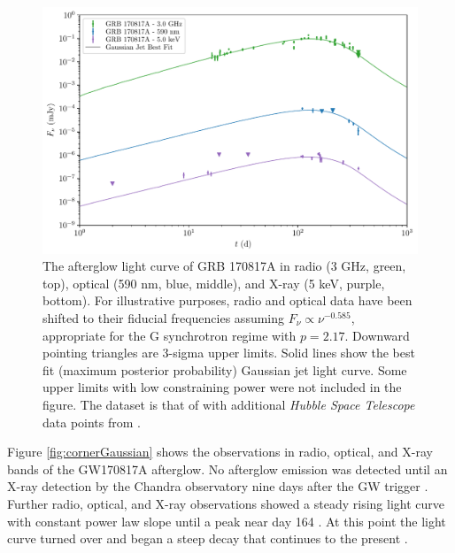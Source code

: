 \documentclass[twocolumn]{aastex62}
\newcommand{\gwbns}{GW170817A}
\newcommand{\grbbns}{GRB 170817A}
\newcommand{\hubble}{{\em Hubble Space Telescope}}
\begin{document}
\begin{figure}
	\includegraphics[width=\textwidth]{figs/lc_170817A_Gaussian_map.pdf}
	\caption{The afterglow light curve of \grbbns{} in radio (3 GHz, green, top), optical (590 nm, blue, middle), and X-ray (5 keV, purple, bottom).  For illustrative purposes, radio and optical data have been shifted to their fiducial frequencies assuming $F_\nu \propto \nu^{-0.585}$, appropriate for the G synchrotron regime with $p=2.17$. Downward pointing triangles are 3-sigma upper limits.  Solid lines show the best fit (maximum posterior probability) Gaussian jet light curve.  Some upper limits with low constraining power were not included in the figure.  The dataset is that of \citet{Troja:2019ab} with additional \hubble{} data points from \citet{Lamb:2019aa}.  \label{fig:lc170817A}}
\end{figure}

Figure \ref{fig:cornerGaussian} shows the observations in radio, optical, and X-ray bands of the \gwbns{} afterglow.  No afterglow emission was detected until an X-ray detection by the Chandra observatory nine days after the GW trigger \cite{Troja:2017aa}.  Further radio, optical, and X-ray observations showed a steady rising light curve with constant power law slope until a peak near day 164 \citep{Haggard:2017aa, Hallinan:2017aa, DAvanzo:2018aa,  Lyman:2018aa, Margutti:2018aa, Mooley:2018aa, Troja:2018aa, Troja:2019ab}.  At this point the light curve turned over and began a steep decay that continues to the present \citep{Alexander:2018aa, Fong:2019aa, Lamb:2019aa, Troja:2019ab}.
\end{document}
